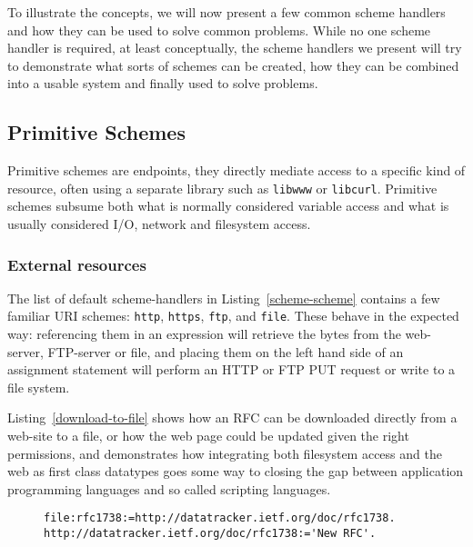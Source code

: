 \documentclass[preprint,authoryear]{llncs}
\begin{document}
To illustrate the concepts, we will now present a few common scheme handlers and how they can be
used to solve common problems.  While no one scheme handler is required, at least conceptually,
the scheme handlers we present will try to demonstrate what sorts of schemes can be created,
how they can be combined into a usable system and finally used to solve problems.

\subsection{Primitive Schemes}
\label{primitiveSchemes}

Primitive schemes are endpoints, they directly
mediate access to a specific kind of resource, often using a separate
library such as {\tt libwww} or {\tt libcurl}.  Primitive schemes
subsume both what is normally considered variable access and 
what is usually considered I/O, network and filesystem access.


\subsubsection{External resources}
\label{externalResources}

The list of default scheme-handlers in Listing~\ref{scheme-scheme} contains a few familiar URI schemes:
{\tt http}, {\tt https}, {\tt ftp}, and {\tt file}.   These behave in the expected way:   referencing them in an expression will
retrieve the bytes from the web-server, FTP-server or file, and placing them on the left hand side of
an assignment statement will perform an HTTP or FTP PUT request or write to a file system. 
 
Listing~\ref{download-to-file} shows how an RFC can be downloaded directly from a web-site
to a file, or how the web page could be updated given the right permissions, and demonstrates how integrating both filesystem access and the web as first class datatypes
goes some way to closing the gap between application programming languages and so called
scripting languages.

\begin{figure}[htbp]
\begin{lstlisting}[style=numbers,label=download-to-file,caption=Downloading an RFC to a file.]
file:rfc1738:=http://datatracker.ietf.org/doc/rfc1738.
http://datatracker.ietf.org/doc/rfc1738:='New RFC'.
\end{lstlisting}
\end{figure}
\end{document}
